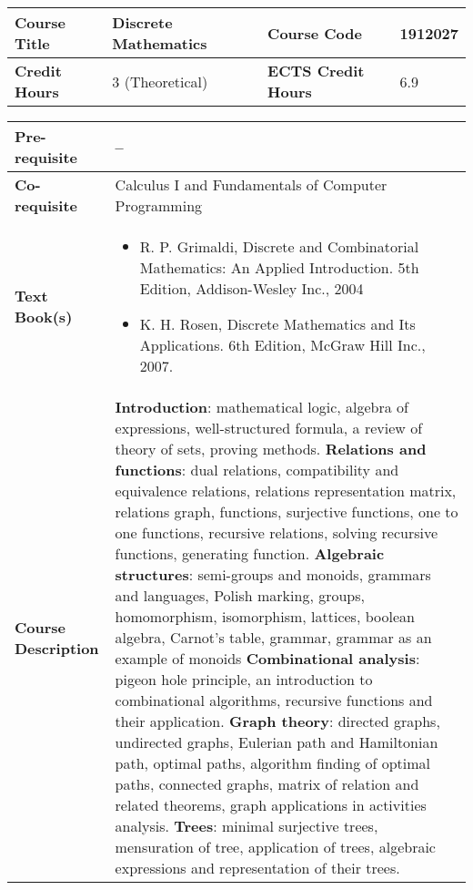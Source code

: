 \documentclass[12pt]{article}
\begin{document}
\begin{minipage}{\textwidth}
\begin{tabularx}{\textwidth}{|l|X|l|X|}
\hline
\textbf{Course Title}       &  Discrete Mathematics & \textbf{Course Code}       &  1912027 \\ \hline
\textbf{Credit Hours}       &  3 (Theoretical) & \textbf{ECTS Credit Hours}       & 6.9  \\ \hline
\end{tabularx}

\begin{tabularx}{\textwidth}{|l|X|}
\hline
\textbf{Pre-requisite}      &  -- \\ \hline
\textbf{Co-requisite}       &  Calculus I and Fundamentals of Computer Programming \\ \hline
\textbf{Text Book(s)}      & \begin{minipage}{.70\textwidth}
					\begin{itemize} \itemsep-0.4em
						\vspace{3mm}
						\item R. P. Grimaldi, Discrete and Combinatorial Mathematics: An Applied Introduction. 5th Edition, Addison-Wesley Inc., 2004
						\item K. H. Rosen, Discrete Mathematics and Its Applications. 6th Edition, McGraw Hill Inc., 2007.
						\vspace{3mm}
					\end{itemize}
				\end{minipage}  \\ \hline
\textbf{Course Description} & \begin{minipage}{.70\textwidth}
					\vspace{3mm}
					\textbf{Introduction}: mathematical logic, algebra of expressions, well-structured formula, a review of theory of
					sets, proving methods. \newline
					\textbf{Relations and functions}: dual relations, compatibility and equivalence relations, relations
					representation matrix, relations graph, functions, surjective functions, one to one functions, recursive
					relations, solving recursive functions, generating function.\newline
					\textbf{Algebraic structures}: semi-groups and monoids, grammars and languages, Polish marking, groups,
					homomorphism, isomorphism, lattices, boolean algebra, Carnot’s table, grammar, grammar as an
					example of monoids\newline
					\textbf{Combinational analysis}: pigeon hole principle, an introduction to combinational algorithms, recursive
					functions and their application.\newline
					\textbf{Graph theory}: directed graphs, undirected graphs, Eulerian path and Hamiltonian path, optimal paths,
					algorithm finding of optimal paths, connected graphs, matrix of relation and related theorems, graph
					applications in activities analysis.\newline
					\textbf{Trees}: minimal surjective trees, mensuration of tree, application of trees, algebraic expressions and
					representation of their trees.					


\end{minipage}
\end{tabularx}
\end{minipage}
\end{document}
